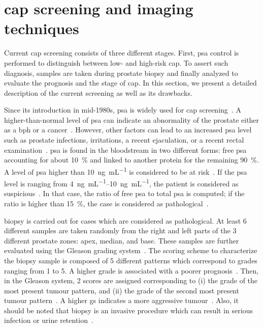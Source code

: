 \section{\acs*{cap} screening and imaging techniques}\label{sec:intro:screening}

Current \ac{cap} screening consists of three different stages.
First, \ac{psa} control is performed to distinguish between low- and high-risk \ac{cap}.
To assert such diagnosis, samples are taken during prostate biopsy and finally analyzed to evaluate the prognosis and the stage of \ac{cap}.
In this section, we present a detailed description of the current screening as well as its drawbacks.

Since its introduction in mid-1980s, \ac{psa} is widely used for \ac{cap} screening~\cite{Etzioni2002}.
A higher-than-normal level of \ac{psa} can indicate an abnormality of the prostate either as a \ac{bph} or a cancer~\cite{Hoeks2011}.
However, other factors can lead to an increased \ac{psa} level such as prostate infections, irritations, a recent ejaculation, or a recent rectal examination~\cite{Parfait2010}.
\ac{psa} is found in the bloodstream in two different forms: free \ac{psa} accounting for about \SI{10}{\percent} and linked to another protein for the remaining \SI{90}{\percent}.
A level of \ac{psa} higher than \SI{10}{\nano\gram\per\milli\liter} is considered to be at risk~\cite{Parfait2010}.
If the \ac{psa} level is ranging from \SIrange{4}{10}{\nano\gram\per\milli\liter}, the patient is considered as suspicious~\cite{Barentsz2012}.
In that case, the ratio of free \ac{psa} to total \ac{psa} is computed; if the ratio is higher than \SI{15}{\percent}, the case is considered as pathological~\cite{Parfait2010}.

 biopsy is carried out for cases which are considered as pathological.
At least 6 different samples are taken randomly from the right and left parts of the 3 different prostate zones: apex, median, and base.
These samples are further evaluated using the Gleason grading system~\cite{Gleason1977}.
The scoring scheme to characterize the biopsy sample is composed of 5 different patterns which correspond to grades ranging from 1 to 5.
A higher grade is associated with a poorer prognosis~\cite{Epstein2005}.
Then, in the Gleason system, 2 scores are assigned corresponding to (i) the grade of the most present tumour pattern, and (ii) the grade of the second most present tumour pattern~\cite{Epstein2005}.
A higher \ac{gs} indicates a more aggressive tumour~\cite{Epstein2005}.
Also, it should be noted that biopsy is an invasive procedure which can result in serious infection or urine retention~\cite{Hara2005,Chou2011}.

